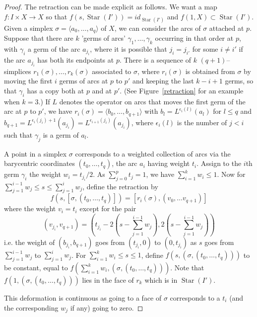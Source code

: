 \documentclass[10pt]{amsart}
\newcommand{\ga}{\gamma}
\newcommand{\s}{\sigma}
\newcommand{\x}{\times}
\newcommand{\lgl}{\langle}
\newcommand{\rgl}{\rangle}
\newcommand{\Star}{\operatorname{Star}}
\begin{document}
\begin{proof}
The retraction can be made explicit as follows. We want a map $f\colon I\x X\to X$ so that $f(s,\Star(I'))=id_{\Star(I')}$ and
$f(1,X)\subset \Star(I')$. Given a simplex $\s=\lgl a_0,\dots,a_q\rgl$ of $X$, 
we can consider the arcs of $\s$ attached at
$p$. Suppose that there are $k$ 'germs of arcs' $\ga_{1},\dots,\ga_{k}$ occurring in that order at $p$, 
with $\ga_i$ a germ of the arc $a_{j_i}$, where it is possible that $j_i=j_{i'}$ for some $i\neq i'$ if the arc $a_{j_i}$ has both its
endpoints at $p$. 
There is a sequence of $k$ $(q+1)$--simplices $r_1(\s),\dots,r_k(\s)$ associated to $\s$, where $r_i(\s)$ is obtained from $\s$ by
moving the first $i$ germs of arcs at $p$ to $p'$ and keeping the last $k-i+1$ germs, so that $\ga_i$ has a copy both at $p$ and at
$p'$. (See Figure~\ref{retraction} for an example when $k=3$.) 
If $L$ denotes the operator on arcs that moves the first germ of the arc at $p$ to $p'$, we have $r_i(\s)=\lgl b_0,\dots,b_{q+1}\rgl$ 
with $b_l=L^{\epsilon_i(l)}(a_l)$ for $l\le q$ and $b_{q+1}=L^{\epsilon_i(j_i)+1}(a_{j_i})=L^{\epsilon_{i+1}(j_i)}(a_{j_i})$, 
where $\epsilon_i(l)$ is
the number of $j<i$ such that $\ga_j$ is a germ of $a_l$.  


A point in a simplex $\s$ corresponds to a weighted collection of arcs via the barycentric coordinates $(t_0,\dots,t_q)$, 
the arc $a_i$ having weight $t_i$.  
Assign to the $i$th germ $\ga_i$ the weight $w_i=t_{j_i}/2$. As $\sum_{j=0}^pt_j=1$, we have $\sum_{i=1}^kw_i\le 1$.   
Now for $\sum_{j=1}^{i-1}w_j\le s\le \sum_{j=1}^iw_j$, define the retraction by 
$$f(s,[\s,(t_0,\dots,t_q)])=[r_i(\s),(v_0,\dots v_{q+1})]$$ 
where the weight $v_i=t_i$ except for  the pair
$$(v_{j_i},v_{q+1})=(t_{j_i}-2(s-\sum_{j=1}^{i-1}w_j),2(s- \sum_{j=1}^{i-1}w_j))$$ 
i.e. the weight of $(b_{j_i},b_{q+1})$ goes from $(t_{j_i},0)$ to
$(0,t_{j_i})$ as $s$ goes from  $\sum_{j=1}^{i-1}w_j$ to  $\sum_{j=1}^iw_j$.
For $\sum_{i=1}^k w_i\le s\le 1$, define  $f(s,(\s,(t_0,\dots,t_q)))$ to be constant, equal to 
$f(\sum_{i=1}^k w_i,(\s,(t_0,\dots,t_q)))$.  
Note that  $f(1,(\s,(t_0,\dots,t_q)))$ lies in the face of $r_k$ which is in $\Star(I')$. 

This deformation is continuous as going
to a face of $\s$ corresponds to a $t_i$ (and the corresponding $w_j$ if any) going to zero.
\end{proof}
\end{document}

